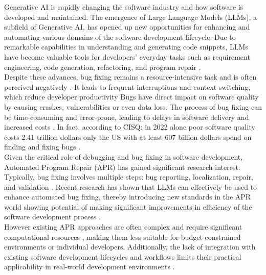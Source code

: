 Generative AI is rapidly changing the software industry and how software is developed and maintained. The emergence of Large Language Models (LLMs), a subfield of Generative AI, has opened up new opportunities for enhancing and automating various domains of the software development lifecycle. Due to remarkable capabilities in understanding and generating code snippets, LLMs have become valuable tools for developers' everyday tasks such as requirement engineering, code generation, refactoring, and program repair \cite{houLargeLanguageModels2024, puvvadiCodingAgentsComprehensive2025}.
\\
Despite these advances, bug fixing remains a resource-intensive task and is often perceived negatively \cite{winterHowDevelopersReally2023}. It leads to frequent interruptions and context switching, which reduce developer productivity  \cite{vasilescuSkyNotLimit2016}
Bugs have direct impact on software quality by causing crashes, vulnerabilities or even data loss. \cite{tihanyiNewEraSoftware2024}
The process of bug fixing can be time-consuming and error-prone, leading to delays in software delivery and increased costs . %
In fact, according to  CISQ: in 2022 alone poor software quality costs 2.41 trillion dollars only the US with at least 607 billion dollars spend on finding and fixing bugs \cite{CostPoorSoftware}.
\\
Given the critical role of debugging and bug fixing in software development, Automated Program Repair (APR) has gained significant research interest.
Typically, bug fixing involves multiple steps: bug reporting, localization, repair, and validation \cite{zhangEmpiricalStudyFactors2012, leeUnifiedDebuggingApproach2024,xiaAgentlessDemystifyingLLMbased2024,zhangPATCHEmpoweringLarge2025, wangEmpiricalResearchUtilizing2025}.
Recent research has shown that LLMs can effectively be used to enhance automated bug fixing, thereby introducing new standards in the APR world showing potential of making significant improvements in efficiency of the software development process \cite{xiaAgentlessDemystifyingLLMbased2024,liuMarsCodeAgentAInative2024,yangSWEagentAgentComputerInterfaces2024, sobaniaAnalysisAutomaticBug2023, xiaAutomatedProgramRepair2024, huCanGPTO1Kill2024}.
\\
However existing APR approaches are often complex and require significant computational resources \cite{rondonEvaluatingAgentbasedProgram2025}, making them less suitable for budget-constrained environments or individual developers. Additionally, the lack of integration with existing software development lifecycles and workflows limits their practical applicability in real-world development environments \cite{chenUnveilingPitfallsUnderstanding2025,liuMarsCodeAgentAInative2024}.
